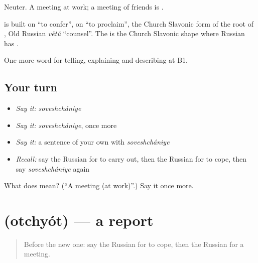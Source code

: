 Neuter. A meeting at work; a meeting of friends is \emph{}.

\begin{cousinweb}
\textbf{} is built on \emph{} \textquotedblleft{}to confer\textquotedblright{}, on \emph{} \textquotedblleft{}to proclaim\textquotedblright{}, the Church Slavonic form of the root of \emph{}, Old Russian \emph{větŭ} \textquotedblleft{}counsel\textquotedblright{}. The \emph{} is the Church Slavonic shape where Russian has \emph{}.
\end{cousinweb}

\begin{grammarlens}[title={What you've built}]
One more word for telling, explaining and describing at B1.
\end{grammarlens}

\subsection*{Your turn}
\begin{itemize}
\raggedright
  \item \emph{Say it:} \emph{soveshchániye}
  \item \emph{Say it:} \emph{soveshchániye}, once more
  \item \emph{Say it:} a sentence of your own with \emph{soveshchániye}
  \item \emph{Recall:} say the Russian for to carry out, then the Russian for to cope, then say \emph{soveshchániye} again
\end{itemize}

\begin{tcolorbox}[breakable,colback=teal!4,colframe=teal!35!black,title={Before you move on}]
What does  mean? (\textquotedblleft{}A meeting (at work)\textquotedblright{}.) Say it once more.
\end{tcolorbox}
\section[\texorpdfstring{\ru{отчёт} (otchyót)}{отчёт (otchyót)}]{ (otchyót) — a report}

\label{lesson:RU-C360-otchyot}



\begin{quote}
Before the new one: say the Russian for to cope, then the Russian for a meeting.
\end{quote}

